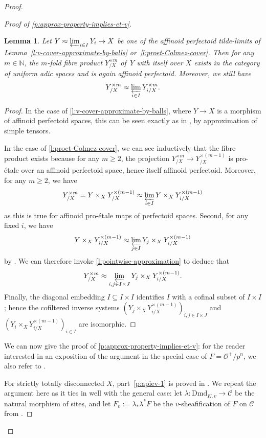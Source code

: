 \documentclass[11pt]{amsart}
\numberwithin{equation}{section}
\newtheorem{Lemma}[thm]{Lemma}
\theoremstyle{definition}
\theoremstyle{remark}
\newcommand{\N}{\mathbb{N}}
\renewcommand{\O}{\mathcal{O}}
\newcommand{\Dmd}{\mathrm{Dmd}}
\begin{document}
\begin{proof}
\begin{proof}[Proof of \cref{p:approx-property-implies-et-v}]
	\begin{Lemma}\label{l:product-of-tilde-limits}
		Let $Y\approx \varprojlim_{i\in I} Y_i\to X$ be one of the affinoid perfectoid  tilde-limits of  Lemma~\ref{l:v-cover-approximate-by-balls} or~\ref{l:proet-Colmez-cover}. Then
		for any $m\in \N$, the $m$-fold fibre product $ Y_{/X}^{\times m}$ of\, $Y$ with itself over $X$ exists in the category of uniform adic spaces and is again affinoid perfectoid. Moreover, we still have
			\[ Y_{/X}^{\times m}\approx \varprojlim_{i\in I} Y_{i/X}^{\times m}.\]
	\end{Lemma}
        
	\begin{proof}
		In the case of \cref{l:v-cover-approximate-by-balls}, where $Y\to X$ is a morphism of affinoid perfectoid spaces, this can be seen exactly as in \cite[Lemma 2.8]{perfectoid-covers-Arizona}, by approximation of simple tensors.
		
		In the case of \cref{l:proet-Colmez-cover}, we can see inductively that the fibre product exists because for any $m\geq 2$, the projection $Y^{\times m}_{/X}\to Y^{\times (m-1)}_{/X}$ is pro-\'etale over an affinoid perfectoid space, hence itself affinoid perfectoid. 
		Moreover, for any $m\geq 2$, we have 
			\[Y^{\times m}_{/X}=Y\times_{X}Y^{\times (m-1)}_{/X}\approx \varprojlim_{i\in I}Y\times_{X}Y^{\times (m-1)}_{i/X}\]
		as this is true for affinoid pro-\'etale maps of perfectoid spaces. Second, for any fixed $i$, we have
			\[Y\times_{X}Y^{\times(m-1)}_{i/X}\approx\varprojlim_{j\in I} Y_j\times_{X}Y^{\times(m-1)}_{i/X}\]
			 by \cite[Lemma 3.13]{heuer-diamantine-Picard}. 
			 We can therefore invoke  \cref{l:pointwise-approximation} to deduce that
			 \[ Y_{/X}^{\times m}\approx \varprojlim_{i,j\in I\times J} Y_j\times_{X}Y^{\times(m-1)}_{i/X}. \]
			  Finally, the diagonal embedding $I\subseteq I\times I$  identifies $I$ with  a cofinal subset of $I\times I$; hence the cofiltered inverse systems $(Y_j\times_{X}Y^{\times(m-1)}_{i/X})_{i,j\in I\times J}$ and $(Y_i\times_{X}Y^{\times(m-1)}_{i/X})_{i\in I}$ are isomorphic.
	\end{proof}

	We can now give the proof of \cref{p:approx-property-implies-et-v}: for the reader interested in an exposition of the argument in the special case of $F=\O^+/p^n$, we also refer to \cite[Appendix C]{Zavyalov_acoh}.	
		
		For strictly totally disconnected $X$, part~\eqref{p:apiev-1} is proved in \cite[Lemma 2.12]{MannWerner_LocSys_p-adVB}. We repeat the argument here as it ties in well with the general case: let $\lambda\colon \Dmd_{K,v}\to \mathcal C$ be the natural morphism of sites, and let $F_v:=\lambda_{\ast}\lambda^{\ast}F$ be the $v$-sheafification of $F$ on $\mathcal C$ from .
		

\end{proof}
\end{proof}
\end{document}
